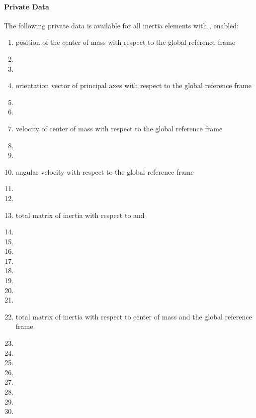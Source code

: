 \paragraph{Private Data}
The following private data is available for all inertia elements with ,  enabled:
\begin{enumerate}
\item {} position of the center of mass with respect to the global reference frame
\item {}
\item {}
\item {} orientation vector of principal axes with respect to the global reference frame
\item {}
\item {}
\item {} velocity of center of mass with respect to the global reference frame
\item {}
\item {}
\item {} angular velocity with respect to the global reference frame
\item {}
\item {}
\item {} total matrix of inertia with respect to  and 
\item {}
\item {}
\item {}
\item {}
\item {}
\item {}
\item {}
\item {}
\item {} total matrix of inertia with respect to center of mass and the global reference frame
\item {}
\item {}
\item {}
\item {}
\item {}
\item {}
\item {}
\item {}

\end{enumerate}
